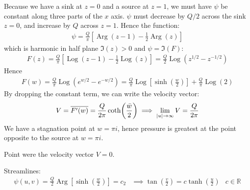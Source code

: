 \documentclass[12pt, english]{book}
\DeclareMathOperator\Log{Log}
\DeclareMathOperator\Arg{Arg}
\begin{document}
	Because we have a sink at \(z = 0\) and a source at \(z = 1\), we must have \(\psi\) be constant along three parts of the \(x\) axis. \(\psi\) must decrease by \(Q/2\) across the sink \(z = 0\), and increase by \(Q\) across \(z = 1\). Hence the function:
	\begin{align*}
		\psi 
		= \frac{Q}{\pi} \left[\Arg(z-1) - \frac{1}{2}\Arg(z)\right]
	\end{align*}
	which is harmonic in half plane \(\Im(z) > 0\) and \(\psi = \Im(F)\):
	\begin{align*}
		F(z)
		= \frac{Q}{\pi} \left[\Log(z-1) - \frac{1}{2}\Log(z)\right]
		= \frac{Q}{2} \Log(z^{1/2} - z^{-1/2})
	\end{align*}
	Hence
	\begin{align*}
		F(w)
		= \frac{Q}{\pi} \Log(e^{w/2} - e^{-w/2})
		= \frac{Q}{\pi} \Log\left[\sinh(\frac{w}{2})\right] + 
		  \frac{Q}{\pi} \Log(2)
	\end{align*}
	By dropping the constant term, we can write the velocity vector:
	\begin{align*}
		V = \overline{F'(w)} = \frac{Q}{2\pi} \coth(\frac{\bar{w}}{2})
		\implies \lim_{\abs{u} \rightarrow \infty} V = \frac{Q}{2\pi}
	\end{align*}
	We have a stagnation point at \(w = \pi i\), hence pressure is greatest at the point opposite to the source at \(w = \pi i\).
	
	\begin{definition}
		\label{Stagnation Point Definition - Complex}
		Point were the velocity vector \(V = 0\).
	\end{definition}

	Streamlines:
	\begin{align*}
		\psi(u,v) = \frac{Q}{2}\Arg\left[\sinh(\frac{w}{2})\right] = c_2
		&\implies \tan(\frac{v}{2}) = c \tanh(\frac{u}{2})
		& c \in \mathbb{R}
	\end{align*}
\end{document}
